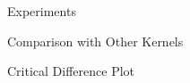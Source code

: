 \begin{frame}{Experiments}
\end{frame}

\begin{frame}{Comparison with Other Kernels}
\end{frame}

\begin{frame}{Critical Difference Plot}
\end{frame}